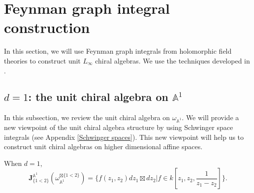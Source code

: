 \documentclass[11pt]{amsart}
\theoremstyle{definition}
\theoremstyle{remark}
\numberwithin{equation}{section}
\begin{document}
\iffalse
\subsection{The chiral chain complex}

The differential $d_{\mathcal{A}}$ and higher chiral operations $\{\mu_n\}$ can be made into a differential
$$
\mathbf{d}+d_{\mathcal{A}}+d_{\mu_2}+d_{\mu_3}+\cdots+
$$
\fi
\section{Feynman graph integral construction}

In this section, we will use Feynman graph integrals from holomorphic field theories to construct unit $L_{\infty}$ chiral algebras. We use the techniques developed in \cite{wang2024feynman}.
\subsection{$d=1$: the unit chiral algebra on $\mathbb{A}^1$}
In this subsection, we review the unit chiral algebra on $\omega_{\mathbb{A}^1}$. We will provide a new viewpoint of the unit chiral algebra structure by using Schwinger space integrals (see Appendix \ref{Schwinger spaces}). This new viewpoint will help us to construct unit chiral algebras on higher dimensional affine spaces.

When $d=1$,
$$
\mathbf{J}^{\mathbb{A}^1}_{\{1<2\}}(\omega_{\mathbb{A}^1}^{\boxtimes\{1<2\}})=\{f(z_{1},z_{2})dz_{1}\boxtimes dz_{2}|f\in k[z_{1},z_{2},\frac{1}{z_{1}-z_{2}}]\}.
$$
\end{document}
